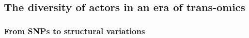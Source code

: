 \documentclass[letter]{bioinfo}
\newcommand{\comment}[1]{\textcolor{red}{#1}}
\begin{document}
	
	
	
\subsection*{The diversity of actors in an era of trans-omics}

\subsubsection*{From SNPs to structural variations}
	
	
\end{document}

